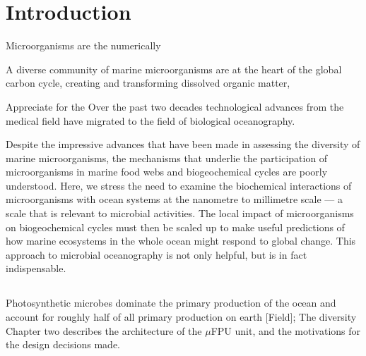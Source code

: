 \chapter{Introduction}

Microorganisms are the numerically 

A diverse community of marine microorganisms are at the heart of the global carbon cycle, creating and transforming dissolved organic matter, 

Appreciate for the 
Over the past two decades technological advances from the medical field have migrated to the field of biological oceanography. 

Despite the impressive advances that have been made in assessing the diversity of marine microorganisms, the mechanisms that underlie the participation of microorganisms in marine food webs and biogeochemical cycles are poorly understood. Here, we stress the need to examine the biochemical interactions of microorganisms with ocean systems at the nanometre to millimetre scale — a scale that is relevant to microbial activities. The local impact of microorganisms on biogeochemical cycles must then be scaled up to make useful predictions of how marine ecosystems in the whole ocean might respond to global change. This approach to microbial oceanography is not only helpful, but is in fact indispensable.
\section{}

\section{}

\section{}

Photosynthetic microbes dominate the primary production of the ocean and account for roughly half of all primary production on earth [Field]; The diversity 
Chapter two describes the architecture of the $\mu$FPU unit, and the
motivations for the design decisions made.





